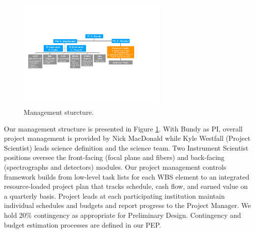 \documentclass[oneside,11pt]{amsart}
\begin{document}
\begin{figure}\small
%
\includegraphics[width=0.65\textwidth]{figs/org_chart_v1.pdf}
%
\caption{Management sturcture.}
%
\label{fig:org}
%
\end{figure}

Our management structure is presented in Figure \ref{fig:org}.  With Bundy as PI, overall project management is
provided by Nick MacDonald while Kyle Westfall (Project Scientist) leads science definition and the science team.  Two
Instrument Scientist positions oversee the front-facing (focal plane and fibers) and back-facing (spectrographs and
detectors) modules.  Our project management controls framework builds from low-level task lists for each WBS element to
an integrated resource-loaded project plan that tracks schedule, cash flow, and earned value on a quarterly basis.
Project leads at each participating institution maintain individual schedules and budgets and report progress to the
Project Manager.  We hold 20\% contingency as appropriate for Preliminary Design. Contingency and budget estimation
processes are defined in our PEP.

\end{document}
